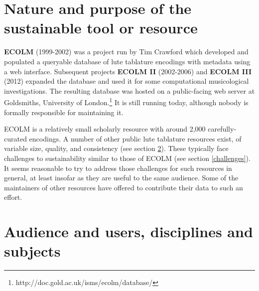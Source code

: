 \documentclass[sigconf]{acmart}
\begin{document}
\maketitle
\begin{sloppypar}


  \section{Nature and purpose of the sustainable tool or resource}

  {\bf ECOLM} (1999-2002) was a project run by Tim Crawford which
  developed and populated a queryable database of lute tablature
  encodings with metadata using a web interface. Subsequent projects
  {\bf ECOLM II} (2002-2006) and {\bf ECOLM III} (2012) expanded the
  database and used it for some computational musicological
  investigations. The resulting database was hosted on a public-facing
  web server at Goldsmiths, University of
  London.\footnote{http://doc.gold.ac.uk/isms/ecolm/database/} It is
  still running today, although nobody is formally responsible for
  maintaining it.

  ECOLM is a relatively small scholarly resource with around 2,000
  carefully-curated encodings. A number of other public lute tablature
  resources exist, of variable size, quality, and consistency (see
  section \ref{audience}). These typically face challenges to
  sustainability similar to those of ECOLM (see section
  \ref{challenges}). It seems reasonable to try to address those
  challenges for such resources in general, at least insofar as they
  are useful to the same audience. Some of the maintainers of other
  resources have offered to contribute their data to such an effort.
  
  \section{Audience and users, disciplines and subjects}\label{audience}
  

\end{sloppypar}
\end{document}
